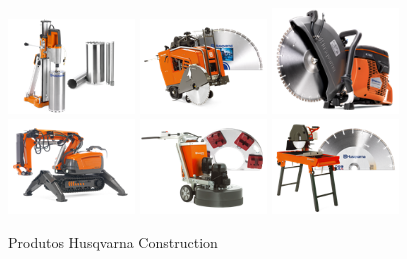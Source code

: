 \documentclass[12pt]{article}
\begin{document}
\begin{figure}[h!]
	\centering
	\includegraphics[width=0.3\textwidth]{img/products/cons1.png}
	\includegraphics[width=0.3\textwidth]{img/products/cons2.png}
	\includegraphics[width=0.3\textwidth]{img/products/cons3.png}
	\\
	\includegraphics[width=0.3\textwidth]{img/products/cons4.png}
	\includegraphics[width=0.3\textwidth]{img/products/cons7.png}
	\includegraphics[width=0.3\textwidth]{img/products/cons8.png}
	\caption{Produtos Husqvarna Construction}
	\label{fig:hc}
\end{figure}
\end{document}
